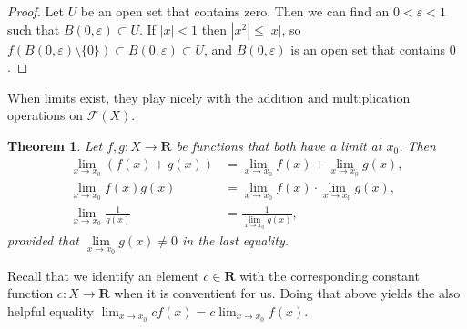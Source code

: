 \documentclass[11pt]{article}
\newtheorem{theo}{Theorem}
\theoremstyle{definition}
\def\eps{\varepsilon}
\def\FF{\mathcal{F}}
\def\RR{\mathbf{R}}
\begin{document}
\begin{proof}
Let $U$ be an open set that contains zero.
Then we can find an $0 < \eps < 1$ such that $B(0, \eps) \subset U$.
If $|x| < 1$ then $|x^2| \leq |x|$, so $f(B(0, \eps) \setminus \{0\}) \subset
B(0, \eps) \subset U$, and $B(0, \eps)$ is an open set that contains $0$.
\end{proof}


When limits exist, they play nicely with the addition and multiplication
operations on $\FF(X)$.

\begin{theo}
Let $f,g : X \to \RR$ be functions that both have a limit at $x_0$.
Then
\begin{align*}
\lim_{x \to x_0}(f(x) + g(x)) &= \lim_{x \to x_0} f(x) + \lim_{x \to x_0} g(x),
\\
\lim_{x \to x_0} f(x) g(x) &= \lim_{x \to x_0} f(x) \cdot \lim_{x \to x_0} g(x),
\\
\lim_{x \to x_0} \frac{1}{g(x)} &= 
\frac{1}{\lim\limits_{x \to x_0} g(x)},
\end{align*}
provided that $\lim\limits_{x \to x_0} g(x) \not= 0$ in the last equality.
\end{theo}


Recall that we identify an element $c \in \RR$ with the corresponding constant
function $c : X \to \RR$ when it is conventient for us.
Doing that above yields the also helpful equality $\lim_{x \to x_0} c f(x) = c
\lim_{x \to x_0} f(x)$.
\end{document}
